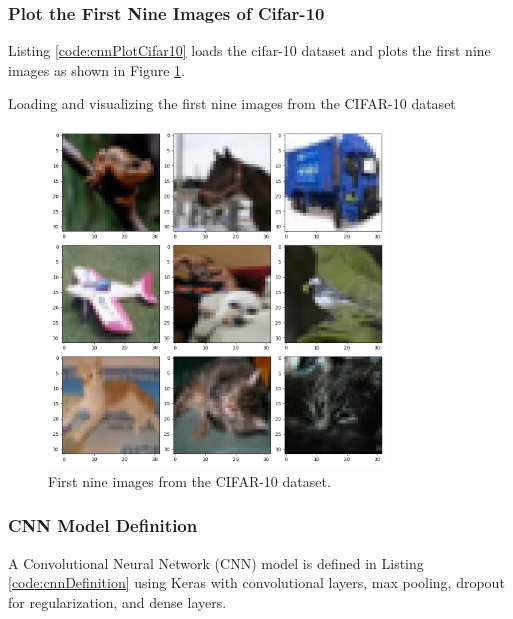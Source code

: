 \subsubsection{Plot the First Nine Images of Cifar-10}

Listing \ref{code:cnnPlotCifar10} loads the cifar-10 dataset and plots the first nine images as shown in Figure \ref{fig:cnnFirstNineCifar10}.

\begin{code}[h!]
	    
	
	\caption{Loading and visualizing the first nine images from the CIFAR-10 dataset}
	\label{code:cnnPlotCifar10}
\end{code}

\begin{figure}[h!]
	\centering
	\includegraphics[width=0.8\textwidth]{Images/DataMining/CIFAR10FirstNineImages}
	\caption{First nine images from the CIFAR-10 dataset.} \label{fig:cnnFirstNineCifar10}
\end{figure}

\subsubsection{CNN Model Definition}

A Convolutional Neural Network (CNN) model is defined in Listing \ref{code:cnnDefinition} using Keras with convolutional layers, max pooling, dropout for regularization, and dense layers.

